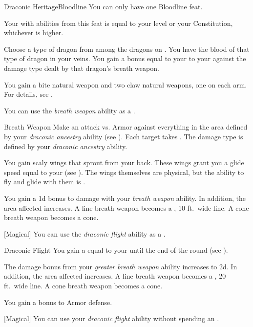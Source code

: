     \begin{feat}{Draconic Heritage}{Bloodline}
         You can only have one Bloodline feat.

         Your  with abilities from this feat is equal to your level or your Constitution, whichever is higher.

         Choose a type of dragon from among the dragons on .
        You have the blood of that type of dragon in your veins.
        You gain a bonus equal to your  to your  against the damage type dealt by that dragon's breath weapon.

         You gain a bite natural weapon and two claw natural weapons, one on each arm.
        For details, see .

         You can use the \textit{breath weapon} ability as a .
        \begin{apability}{Breath Weapon}
            Make an attack vs. Armor against everything in the area defined by your \textit{draconic ancestry} ability (see ).
            \hit Each target takes .
            The damage type is defined by your \textit{draconic ancestry} ability.
        \end{apability}

         You gain scaly wings that sprout from your back.
        These wings grant you a glide speed equal to your  (see ).
        The wings themselves are physical, but the ability to fly and glide with them is .

         You gain a \plus1d bonus to damage with your \textit{breath weapon} ability.
        In addition, the area affected increases.
        A line breath weapon becomes a \areahuge, 10 ft.\ wide line.
        A cone breath weapon becomes a \arealarge cone.

        [Magical] You can use the \textit{draconic flight} ability as a .
        \begin{apability}{Draconic Flight}
            You gain a  equal to your  until the end of the round (see ).
        \end{apability}

         The damage bonus from your \textit{greater breath weapon} ability increases to \plus2d.
        In addition, the area affected increases.
        A line breath weapon becomes a \areahuge, 20 ft.\ wide line.
        A cone breath weapon becomes a \areahuge cone.

         You gain a  bonus to Armor defense.

        [Magical] You can use your \textit{draconic flight} ability without spending an .
    \end{feat}

